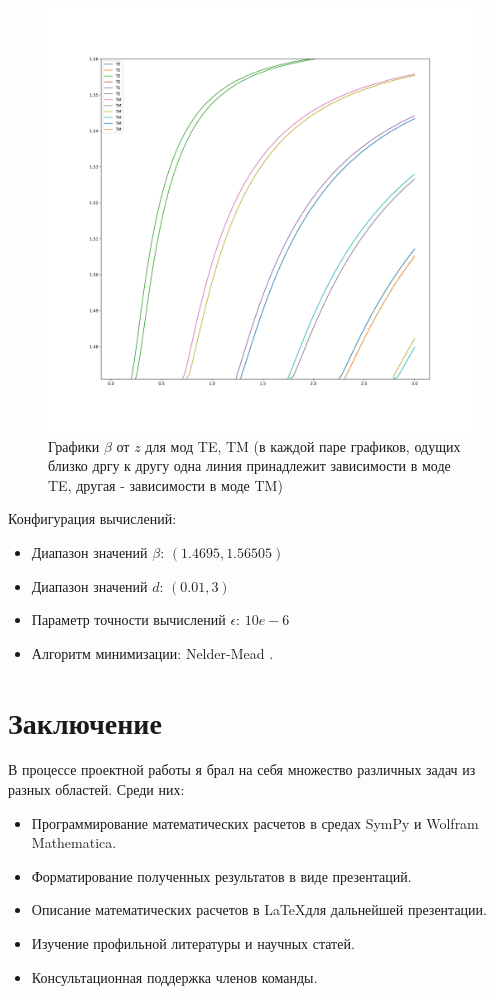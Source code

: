 \documentclass{article}
\begin{document}
\begin{figure}[H]
    \centering
    \includegraphics[width=\linewidth]{final.png}
    \caption{Графики $\beta$ от $z$ для мод TE, TM (в каждой паре графиков, одущих близко дргу к другу одна линия принадлежит зависимости в моде TE, другая - зависимости в моде TM)}
    \label{beta_d}
\end{figure}

Конфигурация вычислений:
\begin{itemize}
    \item Диапазон значений $\beta$: $(1.4695, 1.56505)$
    \item Диапазон значений $d$: $(0.01, 3)$
    \item Параметр точности вычислений $\epsilon$: $10e-6$
    \item Алгоритм минимизации: Nelder-Mead \cite{nelder1965simplex}.
\end{itemize}

\newpage

\section{Заключение}

В процессе проектной работы я брал на себя множество различных задач из разных областей. Среди них: 
\begin{itemize}
    \item Программирование математических расчетов в средах SymPy и Wolfram Mathematica.
    \item Форматирование полученных результатов в виде презентаций.
    \item Описание математических расчетов в \LaTeX для дальнейшей презентации.
    \item Изучение профильной литературы и научных статей.
    \item Консультационная поддержка членов команды.
\end{itemize}
\end{document}
